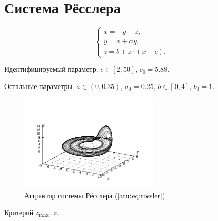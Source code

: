 
\FloatBarrier
\section{Система Рёсслера} %


\begin{equation}
\begin{cases}
  \dot{x}  = -y - z  ,  \\
  \dot{y}  = x + a y ,\\
  \dot{z}  = b + z \cdot ( x-c ) .
\end{cases}
\label{atu:eq:rossler}
\end{equation}

Идентифицируемый параметр:
$ c \in [2; 50] $, $c_0=5.88$.

Остальные параметры:
\( a \in (0, 0.35 ) \), $a_0=0.25$,
\(b \in[0;4] \), $b_0=1$.

\begin{figure}[htb!]
\centerline{\includegraphics[width=0.6\textwidth]{p/cha/ross_phase3.pdf} }
\caption{Аттрактор системы Рёсслера (\ref{atu:eq:rossler})}
\label{atu:f:ross_phase}
\end{figure}

Критерий
$ z_{\max}$, $ \overline{z} $.


